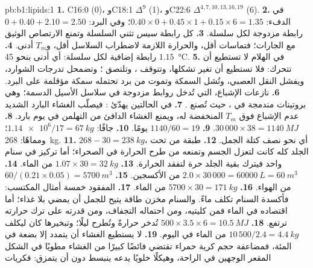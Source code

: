 \begin{solution}{pb:b1:lipids:1}
\textbf{1.} C16:0 (0)، وC18:1 $\Delta^9$ (1)، وC22:6
$\Delta^{4,7,10,13,16,19}$ (6).
\textbf{2.} في الدفء: $0.40\times 0 + 0.45\times 1 + 0.15\times 6 = 1.35$؛
وفي البرد: $0 + 0.40 + 2.10 = 2.50$ رابطة مزدوجة لكل سلسلة.
\textbf{3.} كل رابطة \emph{سيس} تثني السلسلة وتمنع الارتصاص الوثيق مع
الجارات؛ فتماسات  أقل، والحرارة اللازمة لاضطراب السلاسل
أقل، و$T_m$ أدنى.
\textbf{4.} $1.15$ رابطة إضافية لكل سلسلة: أي أدنى بنحو
\qty{45}{\celsius}.
\textbf{5.} في الهلام لا تستطيع  أن تتحرك: فلا تستطيع 
أن تغير تشكلها، وتتوقف ، وتلتصق ؛ وتضمحل تدرجات
الشوارد، ويفشل النقل العصبي، وتُشل السمكة وتموت من برد تحتمله سمكة
مؤقلمة على البرد.
\textbf{6.} نازعات الإشباع، التي تُدخل روابط مزدوجة في سلاسل الأسيل
الدسمة؛ وهي بروتينات مندمجة في ، حيث تُصنع
.
\textbf{7.} في الحالتين يهدّئ : فيصلّب الغشاء البارد الشديد
عدم الإشباع فوق $T_m$ المنخفضة له، ويمنع الغشاء الدافئ من التهلمن في
يوم بارد.
\textbf{8.} $30\,000\times 38 = \qty{1140}{MJ}$.
\textbf{9.} $1140/60 = 19$ يومًا.
\textbf{10.} جافًا: $\num{1.14e6}/17 = \qty{67}{kg}$؛ ومماهًا:
\qty{268}{kg}.
\textbf{11.} $268 - 30 = \qty{238}{kg}$، أي نحو نصف كتلة الجمل.
\textbf{12.} طبقة من  تحت الجلد كله كانت لتعزل الجسم وتمنعه من
طرح الحرارة في الصحراء؛ أما تركيز  في سنام واحد فيترك بقية
الجلد حرة لتفقد الحرارة.
\textbf{13.} $1.07\times 30 = \qty{32}{kg}$ من الماء.
\textbf{14.} $2.0\times 30\,000 = \qty{60000}{L} = \qty{60}{m^3}$ من
الأكسجين.
\textbf{15.} $60/(0.21\times 0.05) = \qty{5700}{m^3}$ من الهواء.
\textbf{16.} $5700\times 30 = \qty{171}{kg}$ من الماء.
\textbf{17.} المفقود خمسة أمثال المكتسب: فأكسدة السنام تكلف ماءً.
والسنام مخزن طاقة يتيح للجمل أن يمضي بلا غذاء؛ أما اقتصاده في الماء
فمن كليتيه، ومن احتماله التجفاف، ومن قدرته على ترك حرارته ترتفع.
\textbf{18.} $500\times 3.5\times 6 = \qty{10.5}{MJ}$ تُدخر حرارةً وتُطرح ليلًا؛ وتبخيرها كان ليكلف $10\,500/2.4 = \qty{4.4}{kg}$ من الماء في اليوم.
\textbf{19.} لا يستطيع الغشاء أن يتمدد إلا بضعة في المئة، فمضاعفة
حجم كرية حمراء تقتضي فائضًا كبيرًا من الغشاء مطويًا في الشكل المقعر
الوجهين في الراحة، وهيكلًا خلويًا يدعه ينبسط دون أن يتمزق: فكريات

\end{solution}
